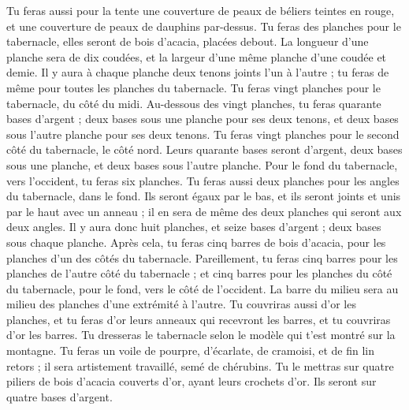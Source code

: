 \begin{multicols}{2}
Tu feras aussi pour la tente une couverture de peaux de béliers teintes en rouge, et une couverture de peaux de dauphins par-dessus.
Tu feras des planches pour le tabernacle, elles seront de bois d’acacia, placées debout.
La longueur d'une planche sera de dix coudées, et la largeur d’une même planche d'une coudée et demie.
Il y aura à chaque planche deux tenons joints l’un à l’autre ; tu feras de même pour toutes les planches du tabernacle.
Tu feras vingt planches pour le tabernacle, du côté du midi.
Au-dessous des vingt planches, tu feras quarante bases d'argent ; deux bases sous une planche pour ses deux tenons, et deux bases sous l'autre planche pour ses deux tenons.
Tu feras vingt planches pour le second côté du tabernacle, le côté nord.
Leurs quarante bases seront d'argent, deux bases sous une planche, et deux bases sous l'autre planche.
Pour le fond du tabernacle, vers l'occident, tu feras six planches.
Tu feras aussi deux planches pour les angles du tabernacle, dans le fond.
Ils seront égaux par le bas, et ils seront joints et unis par le haut avec un anneau ; il en sera de même des deux planches qui seront aux deux angles.
Il y aura donc huit planches, et seize bases d'argent ; deux bases sous chaque planche.
Après cela, tu feras cinq barres de bois d’acacia, pour les planches d'un des côtés du tabernacle.
Pareillement, tu feras cinq barres pour les planches de l'autre côté du tabernacle ; et cinq barres pour les planches du côté du tabernacle, pour le fond, vers le côté de l'occident.
La barre du milieu sera au milieu des planches d’une extrémité à l’autre.
Tu couvriras aussi d'or les planches, et tu feras d'or leurs anneaux qui recevront les barres, et tu couvriras d'or les barres.
Tu dresseras le tabernacle selon le modèle qui t’est montré sur la montagne.
Tu feras un voile de pourpre, d'écarlate, de cramoisi, et de fin lin retors ; il sera artistement travaillé, semé de chérubins.
Tu le mettras sur quatre piliers de bois d’acacia couverts d'or, ayant leurs crochets d'or. Ils seront sur quatre bases d'argent.

\end{multicols}
